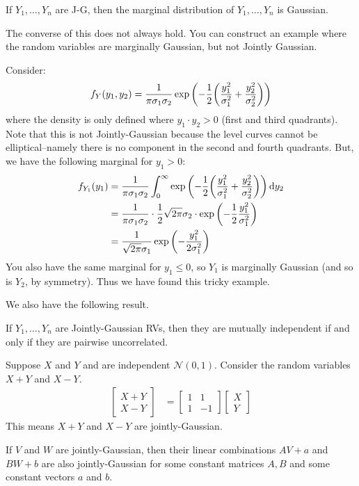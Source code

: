 \begin{theorem}
    If $Y_1, \dots, Y_n$ are J-G, then the marginal distribution of $Y_1, \dots, Y_n$ is Gaussian.
\end{theorem}

The converse of this does not always hold. You can construct an example where the random variables are marginally Gaussian, but not Jointly Gaussian.

\begin{example}
    Consider:
    \begin{align*}
        f_Y(y_1, y_2) &= \frac{1}{\pi \sigma_1 \sigma_2} \exp \qty(-\frac12 \qty(\frac{y_1^2}{\sigma_1^2} + \frac{y_2^2}{\sigma_2^2})) \\
    \end{align*}
    where the density is only defined where $y_1 \cdot y_2 > 0$ (first and third quadrants). Note that this is not Jointly-Gaussian because the level 
    curves cannot be elliptical--namely there is no component in the second and fourth quadrants. But, we have the following marginal for $y_1 > 0$:
    \begin{align*}
        f_{Y_1}(y_1) &= \frac{1}{\pi \sigma_1 \sigma_2} \int_0^{\infty} \exp\qty(-\frac12 \qty(\frac{y_1^2}{\sigma_1^2} + \frac{y_2^2}{\sigma_2^2})) \dd{y_2} \\
        &= \frac{1}{\pi \sigma_1 \sigma_2} \cdot \frac{1}{2} \sqrt{2\pi}  \sigma_2 \cdot \exp\qty(-\frac12 \frac{y_1^2}{\sigma_1^2}) \\
        &= \frac{1}{\sqrt{2 \pi} \sigma_1} \exp \qty(-\frac{y_1^2}{2 \sigma_1^2}) \\
    \end{align*}
    You also have the same marginal for $y_1 \leq 0$, so $Y_1$ is marginally Gaussian (and so is $Y_2$, by symmetry). Thus we have found this tricky example.
\end{example}

We also have the following result.

\begin{theorem}
    If $Y_1, \dots, Y_n$ are Jointly-Gaussian RVs, then they are mutually independent if and only if they are pairwise uncorrelated.    
\end{theorem}

\begin{example}
    Suppose $X$ and $Y$ and are independent $\mathcal{N}(0,1)$. Consider the random variables $X + Y$ and $X- Y$.
    \begin{align*}
        \begin{bmatrix}
            X + Y \\ X - Y
        \end{bmatrix} &= \begin{bmatrix}
            1 & 1 \\ 1 & - 1
        \end{bmatrix} \begin{bmatrix}
            X \\ Y
        \end{bmatrix}
    \end{align*}
    This means $X + Y$ and $X - Y$ are jointly-Gaussian.
\end{example}

\begin{theorem}
    If $V$ and $W$ are jointly-Gaussian, then their linear combinations $AV + a$ and $BW + b$ are also jointly-Gaussian for some constant matrices $A, B$ and
    some constant vectors $a$ and $b$.
\end{theorem}